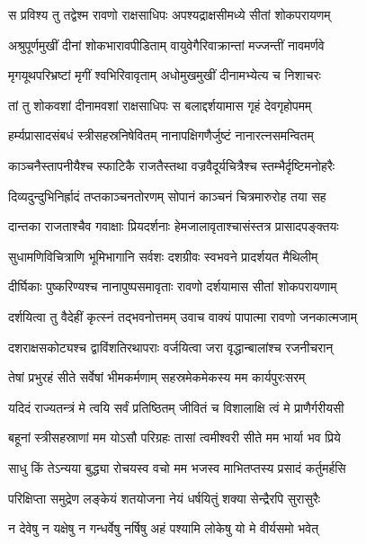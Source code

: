 \twolineshloka
{स प्रविश्य तु तद्वेश्म रावणो राक्षसाधिपः}
{अपश्यद्राक्षसीमध्ये सीतां शोकपरायणम्} %

\twolineshloka
{अश्रुपूर्णमुखीं दीनां शोकभारावपीडिताम्}
{वायुवेगैरिवाक्रान्तां मज्जन्तीं नावमर्णवे} %

\twolineshloka
{मृगयूथपरिभ्रष्टां मृगीं श्वभिरिवावृताम्}
{अधोमुखमुखीं दीनामभ्येत्य च निशाचरः} %

\twolineshloka
{तां तु शोकवशां दीनामवशां राक्षसाधिपः}
{स बलाद्दर्शयामास गृहं देवगृहोपमम्} %

\twolineshloka
{हर्म्यप्रासादसंबधं स्त्रीसहस्रनिषेवितम्}
{नानापक्षिगणैर्जुष्टं नानारत्नसमन्वितम्} %

\twolineshloka
{काञ्चनैस्तापनीयैश्च स्फाटिकै राजतैस्तथा}
{वज्रवैदूर्यचित्रैश्च स्तम्भैर्दृष्टिमनोहरैः} %

\twolineshloka
{दिव्यदुन्दुभिनिर्ह्रादं तप्तकाञ्चनतोरणम्}
{सोपानं काञ्चनं चित्रमारुरोह तया सह} %

\twolineshloka
{दान्तका राजताश्चैव गवाक्षाः प्रियदर्शनाः}
{हेमजालावृताश्चासंस्तत्र प्रासादपङ्क्तयः} %

\twolineshloka
{सुधामणिविचित्राणि भूमिभागानि सर्वशः}
{दशग्रीवः स्वभवने प्रादर्शयत मैथिलीम्} %

\twolineshloka
{दीर्घिकाः पुष्करिण्यश्च नानापुष्पसमावृताः}
{रावणो दर्शयामास सीतां शोकपरायणाम्} %

\twolineshloka
{दर्शयित्वा तु वैदेहीं कृत्स्नं तद्भवनोत्तमम्}
{उवाच वाक्यं पापात्मा रावणो जनकात्मजाम्} %

\twolineshloka
{दशराक्षसकोट्यश्च द्वाविंशतिरथापराः}
{वर्जयित्वा जरा वृद्धान्बालांश्च रजनीचरान्} %

\twolineshloka
{तेषां प्रभुरहं सीते सर्वेषां भीमकर्मणाम्}
{सहस्रमेकमेकस्य मम कार्यपुरःसरम्} %

\twolineshloka
{यदिदं राज्यतन्त्रं मे त्वयि सर्वं प्रतिष्ठितम्}
{जीवितं च विशालाक्षि त्वं मे प्राणैर्गरीयसी} %

\twolineshloka
{बहूनां स्त्रीसहस्राणां मम योऽसौ परिग्रहः}
{तासां त्वमीश्वरी सीते मम भार्या भव प्रिये} %

\twolineshloka
{साधु किं तेऽन्यया बुद्ध्या रोचयस्व वचो मम}
{भजस्व माभितप्तस्य प्रसादं कर्तुमर्हसि} %

\twolineshloka
{परिक्षिप्ता समुद्रेण लङ्केयं शतयोजना}
{नेयं धर्षयितुं शक्या सेन्द्रैरपि सुरासुरैः} %

\twolineshloka
{न देवेषु न यक्षेषु न गन्धर्वेषु नर्षिषु}
{अहं पश्यामि लोकेषु यो मे वीर्यसमो भवेत्} %

